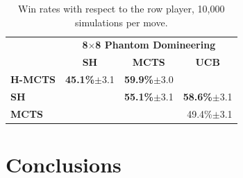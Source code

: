 \documentclass[a4paper]{llncs}
\begin{document}
\begin{table}[ht]
\begin{tabular}{@{}lrrr@{}}
\toprule
                & \multicolumn{3}{c}{\textbf{8$\times$8 Phantom Domineering}}                                                                   \\
                & \multicolumn{1}{c}{\textbf{SH}} & \multicolumn{1}{c}{\textbf{MCTS}} & \multicolumn{1}{c}{\textbf{UCB}} \\ [1mm] \cmidrule(l){2-4} 
\textbf{H-MCTS} & \textbf{45.1\%}$\pm$3.1         & \textbf{59.9\%}$\pm$3.0           &                        			\\[.5mm] 
\textbf{SH}     & \textbf{}                       & \textbf{55.1\%}$\pm$3.1           & \textbf{58.6\%}$\pm$3.1 		\\[.5mm] 
\textbf{MCTS}   & \textbf{}                       & \textbf{}                         & 49.4\%$\pm$3.1          		\\[.5mm] \bottomrule
\end{tabular}

\vspace{2mm}
{\caption{Win rates with respect to the row player, 10,000 simulations per move.} \label{tab:results}}
\end{table}

\section{Conclusions}
\label{sec:concl}



\end{document}
